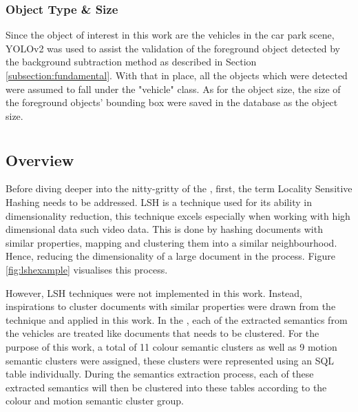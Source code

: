 

\subsubsection{Object Type \& Size}
\label{objecttype}
Since the object of interest in this work are the vehicles in the car park scene, YOLOv2 was used to assist the validation of the foreground object detected by the background subtraction method as described in Section \ref{subsection:fundamental}. With that in place, all the objects which were detected were assumed to fall under the "vehicle" class. As for the object size, the size of the foreground objects' bounding box were saved in the database as the object size.





\section{\versionOneExt }
\label{section:semantic_lsh}

\subsection{Overview}
Before diving deeper into the nitty-gritty of the \versionOneExt, first, the term Locality Sensitive Hashing needs to be addressed. LSH is a technique used for its ability in dimensionality reduction, this technique excels especially when working with high dimensional data such video data.
This is done by hashing documents with similar properties, mapping and clustering them into a similar neighbourhood. Hence, reducing the dimensionality of a large document in the process. Figure \ref{fig:lshexample} visualises this process.

However, LSH techniques were not implemented in this work. Instead, inspirations to cluster documents with similar properties were drawn from the technique and applied in this work. 
In the \versionOneExt, each of the extracted semantics from the vehicles are treated like documents that needs to be  clustered. For the purpose of this work, a total of 11 colour semantic clusters as well as 9 motion semantic clusters were assigned, these clusters were represented using an SQL table individually. 
During the semantics extraction process, each of these extracted semantics will then be clustered into these tables according to the colour and motion semantic cluster group.



